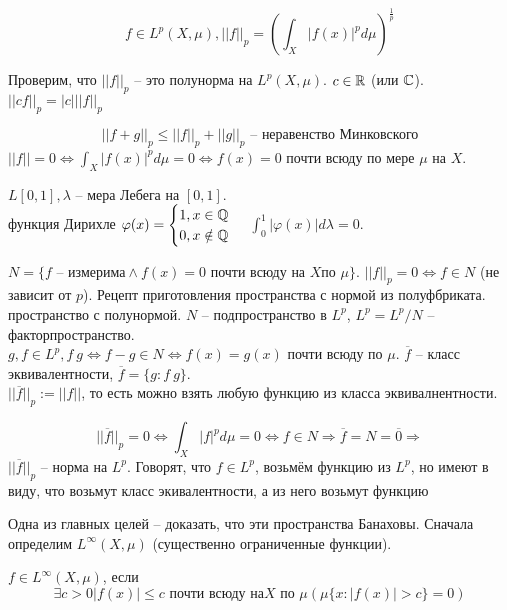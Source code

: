 \documentclass[document]{subfiles}
\begin{document}
\[f \in L^p(X, \mu), ||f||_p = \left( \int_X |f(x)|^p d \mu \right)^{\frac{1}{p}} \]

Проверим, что $||f||_p$ -- это полунорма на $L^p(X,\mu)$. $c \in \mathbb{R}$ (или $\mathbb{C}$). $||cf||_p = |c| ||f||_p$

\[ ||f+g||_p \leq ||f||_p + ||g||_p \text{ -- неравенство Минковского} \]
$||f|| = 0 \Leftrightarrow \int_X |f(x)|^p d\mu = 0 \Leftrightarrow f(x) = 0$ почти всюду по мере $\mu$ на $X$.

\begin{example}
    $L[0,1], \lambda$ -- мера Лебега на $[0,1]$. \\
     функция Дирихле $\varphi(x) = \begin{cases}
        1, x \in \mathbb{Q} \\
        0, x \notin \mathbb{Q}
    \end{cases}$
    $\int^1_0 |\varphi(x)|d\lambda = 0$.
\end{example}

$N = \{ f \text{ -- измерима} \wedge f(x) = 0 \text{ почти всюду на } X \text {по } \mu \}.$
$||f||_p = 0 \Leftrightarrow f \in N$ (не зависит от $p$).
Рецепт приготовления пространства с нормой из полуфбриката. пространство с полунормой.
$N$ -- подпространство в $L^p$, $L^p = L^p / N$ -- факторпространство. \\

$g,f \in L^p, f ~ g \Leftrightarrow f - g \in N \Leftrightarrow f(x) = g(x)$ почти всюду по $\mu$. $\overline{f}$ -- класс эквивалентности, $\overline{f} = \{g: f ~ g \}.$ \\

$||\overline{f}||_p := ||f||$, то есть можно взять любую функцию из класса эквивалнентности.

\[ ||\overline{f}||_p = 0 \Leftrightarrow \int_X |f|^p d\mu = 0 \Leftrightarrow f \in N \Rightarrow \overline{f} = N = \overline{0} \Rightarrow \]
$||\overline{f}||_p $ -- норма на $L^p$.
Говорят, что $f \in L^p$, возьмём функцию из $L^p$, но имеют в виду, что возьмут класс экивалентности, а из него возьмут функцию

Одна из главных целей -- доказать, что эти пространства Банаховы. Сначала определим $L^\infty(X, \mu)$ (существенно ограниченные функции).

\begin{definition}[$L^\infty(X, \mu)$]
    $f \in L^\infty(X, \mu)$, если 
    \[\exists c > 0 |f(x)| \leq c \text{ почти всюду на} X \text{ по } \mu (\mu \{ x: |f(x)| > c\} = 0)\]
\end{definition}
\end{document}
